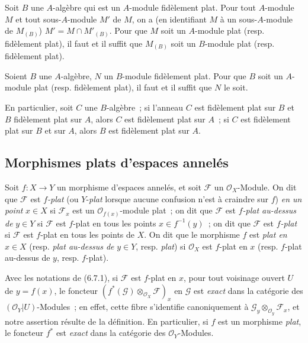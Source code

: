 \begin{env}[6.6.3]
\label{0.6.6.3-fr}
Soit $B$ une $A$-algèbre qui est un $A$-module fidèlement plat. Pour tout
$A$-module $M$ et tout sous-$A$-module $M'$ de $M$, on a (en identifiant $M$
à un sous-$A$-module de $M_{(B)}$) $M'=M\cap M'_{(B)}$. Pour que $M$ soit un
$A$-module plat (resp. fidèlement plat), il faut et il suffit que $M_{(B)}$
soit un $B$-module plat (resp. fidèlement plat).
\end{env}

\begin{env}[6.6.4]
\label{0.6.6.4-fr}
Soient $B$ une $A$-algèbre, $N$ un $B$-module fidèlement plat. Pour que $B$
soit un $A$-module plat (resp. fidèlement plat), il faut et il suffit que $N$
le soit.

En particulier, soit $C$ une $B$-algèbre~; si l'anneau $C$ est fidèlement
plat sur $B$ et $B$ fidèlement plat sur $A$, alors $C$ est fidèlement plat
sur $A$~; si $C$ est fidèlement plat sur $B$ et sur $A$, alors $B$ est
fidèlement plat sur $A$.
\end{env}

\subsection{Morphismes plats d'espaces annelés}
\label{subsection:0.6.7-fr}

\begin{env}[6.7.1]
\label{0.6.7.1-fr}
Soit $f:X\to Y$ un morphisme d'espaces annelés, et soit $\mathcal F$ un
$\mathcal O_X$-Module. On dit que $\mathcal F$ est \emph{$f$-plat} (ou $Y$-\emph{plat}
lorsque aucune confusion n'est à craindre sur $f$) \emph{en un point} $x\in X$ si
$\mathcal F_x$ est un $\mathcal O_{f(x)}$-module plat~; on dit que
$\mathcal F$ est \emph{$f$-plat au-dessus de} $y\in Y$ si $\mathcal F$ est $f$-plat
en tous les points $x\in f^{-1}(y)$~; on dit que $\mathcal F$ est \emph{$f$-plat}
si $\mathcal F$ est $f$-plat en tous les points de $X$. On dit que le
morphisme $f$ est \emph{plat en} $x\in X$ (resp. \emph{plat au-dessus de} $y\in Y$, resp.
\emph{plat}) si $\mathcal O_X$ est $f$-plat en $x$ (resp. $f$-plat au-dessus de $y$,
resp. $f$-plat).
\end{env}

\begin{env}[6.7.2]
\label{0.6.7.2-fr}
Avec les notations de (6.7.1), si $\mathcal F$ est $f$-plat en $x$, pour tout
voisinage ouvert $U$ de $y=f(x)$, le foncteur
$(f^*(\mathcal G)\otimes_{\mathcal O_X}\mathcal F)_x$ en $\mathcal G$ est
\emph{exact} dans la catégorie des $(\mathcal O_Y|U)$-Modules~; en effet, cette
fibre s'identifie canoniquement à
$\mathcal G_y\otimes_{\mathcal O_y}\mathcal F_x$, et notre assertion résulte
de la définition. En particulier, si $f$ est un morphisme \emph{plat}, le foncteur
$f^*$ est \emph{exact} dans la catégorie des $\mathcal O_Y$-Modules.
\end{env}

